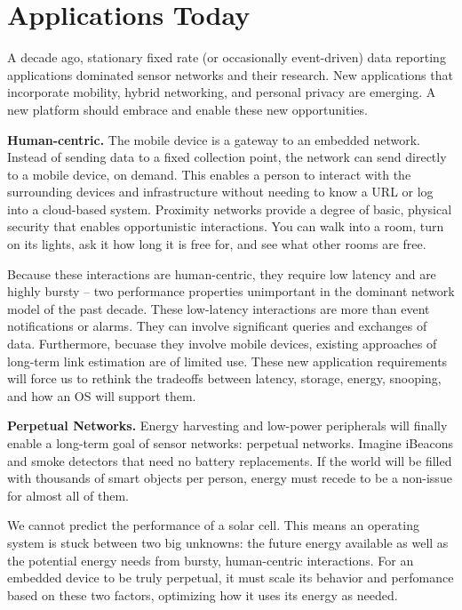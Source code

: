 \section{Applications Today}

A decade ago, stationary fixed rate (or occasionally event-driven) data 
reporting applications dominated sensor networks and their research. 
New applications that incorporate mobility, hybrid networking, and 
personal privacy are emerging. A new platform should embrace and enable 
these new opportunities.

\smallskip\noindent
\textbf{Human-centric.}
The mobile device is a gateway to an embedded network. Instead of
sending data to a fixed collection point, the network can send directly
to a mobile device, on demand. This enables a person to interact with
the surrounding devices and infrastructure without needing to know a
URL or log into a cloud-based system. Proximity networks provide a degree
of basic, physical security that enables opportunistic interactions.
You can walk into a room, turn on its lights, ask it how long it is free for,
and see what other rooms are free.

Because these interactions are human-centric, they require low latency and
are highly bursty -- two performance properties unimportant in the
dominant network model of the past decade. These low-latency interactions
are more than event notifications or alarms. They can involve significant
queries and exchanges of data. Furthermore, becuase they involve mobile
devices, existing approaches of long-term link estimation are of limited use.
These new application requirements will force us to rethink the tradeoffs
between latency, storage, energy, snooping, and how an OS will support them.

\smallskip\noindent
\textbf{Perpetual Networks.}
Energy harvesting and low-power peripherals will finally enable a
long-term goal of sensor networks: perpetual networks. Imagine
iBeacons and smoke detectors that need no battery replacements. If the world
will be filled with thousands of smart objects per person, energy must recede
to be a non-issue for almost all of them.

We cannot
predict the performance of a solar cell. This means an operating system
is stuck between two big unknowns: the future energy available as well as
the potential energy needs from bursty, human-centric interactions. For
an embedded device to be truly perpetual, it must scale its behavior and
perfomance based on these two factors, optimizing how it uses its energy
as needed.

